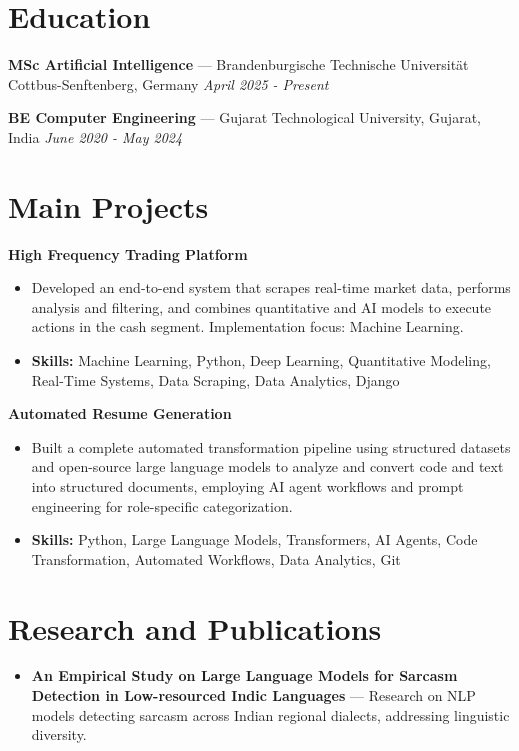 \documentclass[a4paper,10pt]{article}
\begin{document}
\section*{Education}
\textbf{MSc Artificial Intelligence} — Brandenburgische Technische Universität Cottbus-Senftenberg, Germany \hfill \textit{April 2025 - Present}\par
\vspace{1.5pt}
\textbf{BE Computer Engineering} — Gujarat Technological University, Gujarat, India \hfill \textit{June 2020 - May 2024}\par

\section*{Main Projects}
\textbf{High Frequency Trading Platform}\par
\vspace{1pt}
\begin{itemize}
  \item Developed an end-to-end system that scrapes real-time market data, performs analysis and filtering, and combines quantitative and AI models to execute actions in the cash segment. Implementation focus: Machine Learning.
  \item \textbf{Skills:} Machine Learning, Python, Deep Learning, Quantitative Modeling, Real-Time Systems, Data Scraping, Data Analytics, Django
\end{itemize}
\vspace{3pt}
\textbf{Automated Resume Generation}\par
\vspace{1pt}
\begin{itemize}
  \item Built a complete automated transformation pipeline using structured datasets and open-source large language models to analyze and convert code and text into structured documents, employing AI agent workflows and prompt engineering for role-specific categorization.
  \item \textbf{Skills:} Python, Large Language Models, Transformers, AI Agents, Code Transformation, Automated Workflows, Data Analytics, Git
\end{itemize}

\section*{Research and Publications}
\begin{itemize}
\item \textbf{An Empirical Study on Large Language Models for Sarcasm Detection in Low-resourced Indic Languages} — Research on NLP models detecting sarcasm across Indian regional dialects, addressing linguistic diversity.
\end{itemize}
\end{document}
